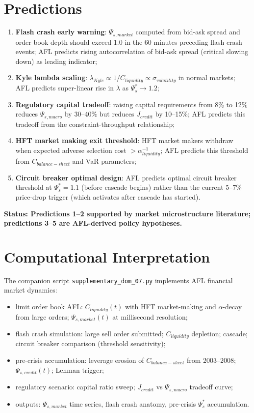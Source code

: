 \documentclass[11pt]{article}
\begin{document}
\section{Predictions}

\begin{enumerate}
    \item \textbf{Flash crash early warning}: $\Psi_{s,market}$ computed from bid-ask spread and
          order book depth should exceed 1.0 in the 60 minutes preceding flash crash events;
          AFL predicts rising autocorrelation of bid-ask spread (critical slowing down) as
          leading indicator;
    \item \textbf{Kyle lambda scaling}: $\lambda_{Kyle} \propto 1/C_{liquidity} \propto \sigma_{volatility}$
          in normal markets; AFL predicts super-linear rise in $\lambda$ as $\Psi_s^* \to 1.2$;
    \item \textbf{Regulatory capital tradeoff}: raising capital requirements from 8\% to 12\%
          reduces $\Psi_{s,macro} $ by 30--40\% but reduces $J_{credit}$ by 10--15\%; AFL predicts
          this tradeoff from the constraint-throughput relationship;
    \item \textbf{HFT market making exit threshold}: HFT market makers withdraw when expected
          adverse selection cost $> \alpha_{liquidity}^{-1}$; AFL predicts this threshold from
          $C_{balance-sheet}$ and VaR parameters;
    \item \textbf{Circuit breaker optimal design}: AFL predicts optimal circuit breaker threshold
          at $\Psi_s^* = 1.1$ (before cascade begins) rather than the current 5--7\% price-drop
          trigger (which activates after cascade has started).
\end{enumerate}

\textbf{Status: Predictions 1--2 supported by market microstructure literature; predictions 3--5
are AFL-derived policy hypotheses.}

\section{Computational Interpretation}

The companion script \texttt{supplementary\_dom\_07.py} implements AFL financial market dynamics:
\begin{itemize}
    \item limit order book AFL: $C_{liquidity}(t)$ with HFT market-making and $\alpha$-decay from
          large orders; $\Psi_{s,market}(t)$ at millisecond resolution;
    \item flash crash simulation: large sell order submitted; $C_{liquidity}$ depletion; cascade;
          circuit breaker comparison (threshold sensitivity);
    \item pre-crisis accumulation: leverage erosion of $C_{balance-sheet}$ from 2003--2008;
          $\Psi_{s,credit}(t)$; Lehman trigger;
    \item regulatory scenario: capital ratio sweep; $J_{credit}$ vs $\Psi_{s,macro}$ tradeoff curve;
    \item outputs: $\Psi_{s,market}$ time series, flash crash anatomy, pre-crisis $\Psi_s^*$ accumulation.
\end{itemize}
\end{document}
